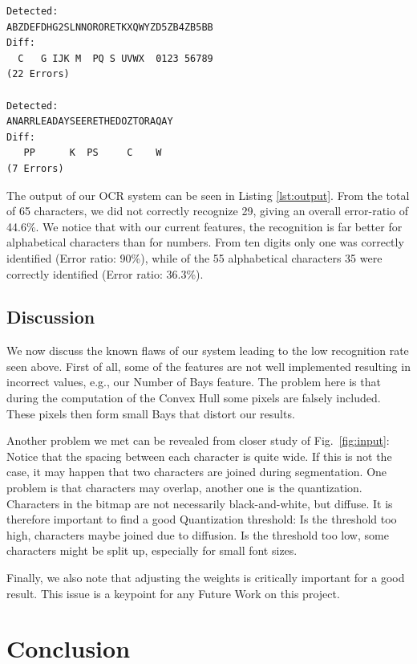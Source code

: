 \documentclass{article}
\begin{document}
\newpage

\begin{lstlisting}[caption={Result of our evaluation},label={lst:output}]
Detected: 
ABZDEFDHG2SLNNORORETKXQWYZD5ZB4ZB5BB
Diff:
  C   G IJK M  PQ S UVWX  0123 56789
(22 Errors)

Detected:
ANARRLEADAYSEERETHEDOZTORAQAY
Diff:
   PP      K  PS     C    W  
(7 Errors)
\end{lstlisting}

The output of our OCR system can be seen in Listing \ref{lst:output}. From the total of 65 characters, we did not correctly recognize 29, giving an overall error-ratio of 44.6\%.
We notice that with our current features, the recognition is far better for alphabetical characters than for numbers. From ten digits only one was correctly identified (Error ratio: 90\%), while of the 55 alphabetical characters 35 were correctly identified (Error ratio: 36.3\%). 

\subsection{Discussion}
We now discuss the known flaws of our system leading to the low recognition rate seen above. First of all, some of the features are not well implemented resulting in incorrect values, e.g., our Number of Bays feature. The problem here is that during the computation of the Convex Hull some pixels are falsely included. These pixels then form small Bays that distort our results.

Another problem we met can be revealed from closer study of Fig.~\ref{fig:input}: Notice that the spacing between each character is quite wide. If this is not the case, it may happen that two characters are joined during segmentation. One problem is that characters may overlap, another one is the quantization. Characters in the bitmap are not necessarily black-and-white, but diffuse. It is therefore important to find a good Quantization threshold: Is the threshold too high, characters maybe joined due to diffusion. Is the threshold too low, some characters might be split up, especially for small font sizes.

Finally, we also note that adjusting the weights is critically important for a good result. This issue is a keypoint for any Future Work on this project.

\section{Conclusion}
\end{document}
